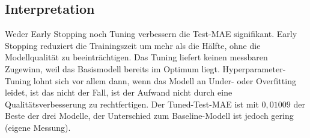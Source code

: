 \subsection{Interpretation}

Weder Early Stopping noch Tuning verbessern die Test-\ac{MAE} signifikant. Early Stopping reduziert die Trainingszeit um mehr als die Hälfte, ohne die Modellqualität zu beeinträchtigen. Das Tuning liefert keinen messbaren Zugewinn, weil das Basismodell bereits im Optimum liegt. Hyperparameter-Tuning lohnt sich vor allem dann, wenn das Modell an Under- oder Overfitting leidet, ist das nicht der Fall, ist der Aufwand nicht durch eine Qualitätsverbesserung zu rechtfertigen. Der Tuned-Test-\ac{MAE} ist mit $0{,}01009$ der Beste der drei Modelle, der Unterschied zum Baseline-Modell ist jedoch gering (eigene Messung).

